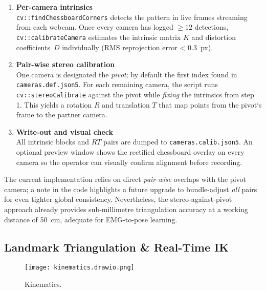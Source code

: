 \begin{enumerate}[label=\arabic*.]
  \item \textbf{Per-camera intrinsics}\\
        \verb|cv::findChessboardCorners| detects the pattern in live frames
        streaming from each webcam. Once every camera has logged
        $\ge12$ detections, \verb|cv::calibrateCamera| estimates the intrinsic
        matrix $K$ and distortion coefficients~$D$ individually
        (RMS reprojection error < \SI{0.3}{px}).

  \item \textbf{Pair-wise stereo calibration}\\
        One camera is designated the \emph{pivot}; by default the first index
        found in \texttt{cameras.def.json5}. For each remaining camera, the
        script runs \verb|cv::stereoCalibrate| against the pivot while
        \emph{fixing} the intrinsics from step 1.
        This yields a rotation $R$ and translation $T$ that map points from the
        pivot`s frame to the partner camera.

  \item \textbf{Write-out and visual check}\\
        All intrinsic blocks and $R\!T$ pairs are dumped to
        \texttt{cameras.calib.json5}. An optional preview window shows the
        rectified chessboard overlay on every camera so the operator can
        visually confirm alignment before recording.
\end{enumerate}

\noindent
The current implementation relies on direct \emph{pair-wise} overlaps with the pivot camera; a note in the code highlights a future upgrade to bundle-adjust \emph{all} pairs for even tighter global consistency. Nevertheless, the stereo-against-pivot approach already provides sub-millimetre triangulation accuracy at a working distance of \SI{50}{\centi\metre}, adequate for EMG-to-pose learning.

\subsection{Landmark Triangulation \& Real-Time IK}

\begin{figure}[H]
    \centering
    \texttt{[image: kinematics.drawio.png]}
    \caption{Kinematics.}
    \label{fig:kinematics}
\end{figure}


